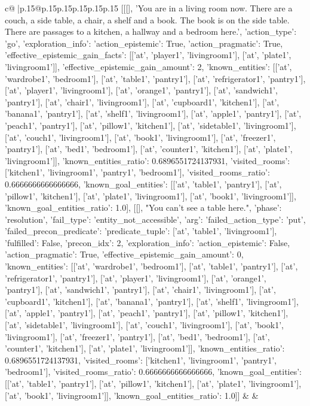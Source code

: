 \documentclass{article}
\begin{document}
{\begin{supertabular}{c@{$\;$}|p{.15\linewidth}@{}p{.15\linewidth}p{.15\linewidth}p{.15\linewidth}p{.15\linewidth}p{.15\linewidth}}
{{{	 [[[], 'You are in a living room now. There are a couch, a side table, a chair, a shelf and a book. The book is on the side table. There are passages to a kitchen, a hallway and a bedroom here.', {'action_type': 'go', 'exploration_info': {'action_epistemic': True, 'action_pragmatic': True, 'effective_epistemic_gain_facts': [['at', 'player1', 'livingroom1'], ['at', 'plate1', 'livingroom1']], 'effective_epistemic_gain_amount': 2, 'known_entities': [['at', 'wardrobe1', 'bedroom1'], ['at', 'table1', 'pantry1'], ['at', 'refrigerator1', 'pantry1'], ['at', 'player1', 'livingroom1'], ['at', 'orange1', 'pantry1'], ['at', 'sandwich1', 'pantry1'], ['at', 'chair1', 'livingroom1'], ['at', 'cupboard1', 'kitchen1'], ['at', 'banana1', 'pantry1'], ['at', 'shelf1', 'livingroom1'], ['at', 'apple1', 'pantry1'], ['at', 'peach1', 'pantry1'], ['at', 'pillow1', 'kitchen1'], ['at', 'sidetable1', 'livingroom1'], ['at', 'couch1', 'livingroom1'], ['at', 'book1', 'livingroom1'], ['at', 'freezer1', 'pantry1'], ['at', 'bed1', 'bedroom1'], ['at', 'counter1', 'kitchen1'], ['at', 'plate1', 'livingroom1']], 'known_entities_ratio': 0.6896551724137931, 'visited_rooms': ['kitchen1', 'livingroom1', 'pantry1', 'bedroom1'], 'visited_rooms_ratio': 0.6666666666666666, 'known_goal_entities': [['at', 'table1', 'pantry1'], ['at', 'pillow1', 'kitchen1'], ['at', 'plate1', 'livingroom1'], ['at', 'book1', 'livingroom1']], 'known_goal_entities_ratio': 1.0}}], [[], "You can't see a table here.", {'phase': 'resolution', 'fail_type': 'entity_not_accessible', 'arg': {'failed_action_type': 'put', 'failed_precon_predicate': {'predicate_tuple': ['at', 'table1', 'livingroom1'], 'fulfilled': False, 'precon_idx': 2}}, 'exploration_info': {'action_epistemic': False, 'action_pragmatic': True, 'effective_epistemic_gain_amount': 0, 'known_entities': [['at', 'wardrobe1', 'bedroom1'], ['at', 'table1', 'pantry1'], ['at', 'refrigerator1', 'pantry1'], ['at', 'player1', 'livingroom1'], ['at', 'orange1', 'pantry1'], ['at', 'sandwich1', 'pantry1'], ['at', 'chair1', 'livingroom1'], ['at', 'cupboard1', 'kitchen1'], ['at', 'banana1', 'pantry1'], ['at', 'shelf1', 'livingroom1'], ['at', 'apple1', 'pantry1'], ['at', 'peach1', 'pantry1'], ['at', 'pillow1', 'kitchen1'], ['at', 'sidetable1', 'livingroom1'], ['at', 'couch1', 'livingroom1'], ['at', 'book1', 'livingroom1'], ['at', 'freezer1', 'pantry1'], ['at', 'bed1', 'bedroom1'], ['at', 'counter1', 'kitchen1'], ['at', 'plate1', 'livingroom1']], 'known_entities_ratio': 0.6896551724137931, 'visited_rooms': ['kitchen1', 'livingroom1', 'pantry1', 'bedroom1'], 'visited_rooms_ratio': 0.6666666666666666, 'known_goal_entities': [['at', 'table1', 'pantry1'], ['at', 'pillow1', 'kitchen1'], ['at', 'plate1', 'livingroom1'], ['at', 'book1', 'livingroom1']], 'known_goal_entities_ratio': 1.0}}]] 
	  } 
	   } 
	   } 
	 & & \\ 
 


\end{supertabular}}
\end{document}
